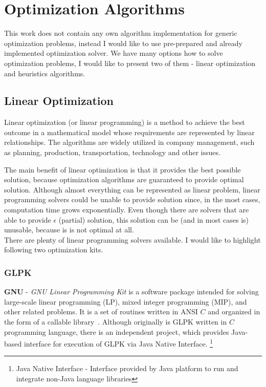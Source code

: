 
\section{Optimization Algorithms}\label{sec:optimization-algorithms}

This work does not contain any own algorithm implementation for generic optimization problems,
instead I would like to use pre-prepared and already implemented optimization solver.
We have many options how to solve optimization problems, I would like to present two of them
- linear optimization and heuristics algorithms.

\subsection{Linear Optimization}\label{subsec:linear-optimization}
Linear optimization (or linear programming) is a method to achieve the best outcome in a mathematical model
whose requirements are represented by linear relationships.\cite{web_wiki:linearProgramming}
The algorithms are widely utilized in company management, such as planning, production, transportation, technology and other issues.

The main benefit of linear optimization is that it provides the best possible solution,
because optimization algorithms are guaranteed to provide optimal solution.
Although almost everything can be represented as linear problem,
linear programming solvers could be unable to provide solution since, in the most cases, computation time grows exponentially.
Even though there are solvers that are able to provide $\epsilon$ (partial) solution,
this solution can be (and in most cases is) unusable, because is is not optimal at all.\\

There are plenty of linear programming solvers available.
I would like to highlight following two optimization kits.

\subsubsection{GLPK}
\textbf{GNU} - \textit{GNU Linear Programming Kit} is a software package intended for solving large-scale linear programming (LP),
mixed integer programming (MIP), and other related problems.
It is a set of routines written in ANSI $C$ and organized in the form of a callable library~\cite{web:gnuGlpk}.
Although originally is GLPK written in $C$ programming language,
there is an independent project,
which provides Java-based interface for execution of GLPK via Java Native Interface.
\footnote{Java Native Interface - Interface provided by Java platform to run and integrate non-Java language libraries}

